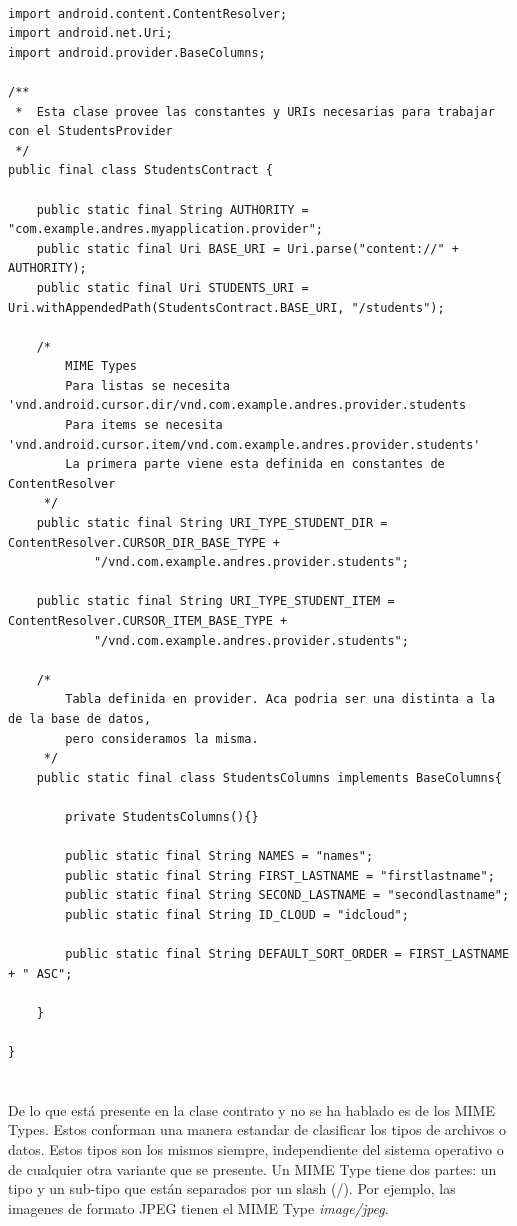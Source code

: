 \documentclass[10pt]{extarticle}
\begin{document}
\begin{lstlisting}

import android.content.ContentResolver;
import android.net.Uri;
import android.provider.BaseColumns;

/**
 *  Esta clase provee las constantes y URIs necesarias para trabajar con el StudentsProvider
 */
public final class StudentsContract {

    public static final String AUTHORITY = "com.example.andres.myapplication.provider";
    public static final Uri BASE_URI = Uri.parse("content://" + AUTHORITY);
    public static final Uri STUDENTS_URI = Uri.withAppendedPath(StudentsContract.BASE_URI, "/students");

    /*
        MIME Types
        Para listas se necesita  'vnd.android.cursor.dir/vnd.com.example.andres.provider.students
        Para items se necesita 'vnd.android.cursor.item/vnd.com.example.andres.provider.students'
        La primera parte viene esta definida en constantes de ContentResolver
     */
    public static final String URI_TYPE_STUDENT_DIR = ContentResolver.CURSOR_DIR_BASE_TYPE +
            "/vnd.com.example.andres.provider.students";

    public static final String URI_TYPE_STUDENT_ITEM = ContentResolver.CURSOR_ITEM_BASE_TYPE +
            "/vnd.com.example.andres.provider.students";

    /*
        Tabla definida en provider. Aca podria ser una distinta a la de la base de datos,
        pero consideramos la misma.
     */
    public static final class StudentsColumns implements BaseColumns{

        private StudentsColumns(){}

        public static final String NAMES = "names";
        public static final String FIRST_LASTNAME = "firstlastname";
        public static final String SECOND_LASTNAME = "secondlastname";
        public static final String ID_CLOUD = "idcloud";

        public static final String DEFAULT_SORT_ORDER = FIRST_LASTNAME + " ASC";

    }

}
     
\end{lstlisting}

\paragraph{}
De lo que está presente en la clase contrato y no se ha hablado es de los MIME Types. Estos conforman una manera estandar de clasificar los tipos de archivos o datos. Estos tipos son los mismos siempre, independiente del sistema operativo o de cualquier otra variante que se presente. Un MIME Type tiene dos partes: un tipo y un sub-tipo que están separados por un slash (/). Por ejemplo, las imagenes de formato JPEG tienen el MIME Type \textit{image/jpeg}.
\end{document}
